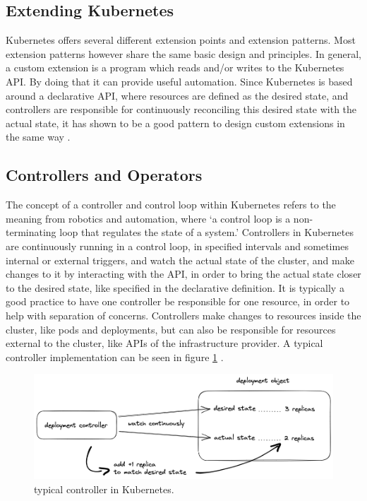 \subsection*{Extending Kubernetes}
Kubernetes offers several different extension points and extension patterns.
Most extension patterns however share the same basic design and principles.
In general, a custom extension is a program which reads and/or writes
to the Kubernetes API. By doing that it can provide useful automation.
Since Kubernetes is based around a declarative API,
where resources are defined as the desired state,
and controllers are responsible for continuously reconciling this
desired state with the actual state,
it has shown to be a good pattern to design custom extensions in the same way
\autocite{extendKubernetes}.

\subsection*{Controllers and Operators}
The concept of a controller and control loop within Kubernetes refers to the
meaning from robotics and automation, where
\enquote*{a control loop is a non-terminating loop that regulates the state of a system.}
\autocite{controllersKubernetes}
Controllers in Kubernetes are continuously running in a control loop,
in specified intervals and sometimes internal or external triggers, 
and watch the actual state of the cluster,
and make changes to it by interacting with the API,
in order to bring the actual state closer to the desired state,
like specified in the declarative definition.
It is typically a good practice to have one controller
be responsible for one resource, 
in order to help with separation of concerns.
Controllers make changes to resources inside the cluster,
like pods and deployments,
but can also be responsible for resources external to the cluster,
like APIs of the infrastructure provider.
A typical controller implementation can be seen in figure \ref{fig:typicalControllerKubernetes}
\autocite{controllersKubernetes}.

\begin{figure}[h]
	\centering
	\includegraphics[width=1.00\linewidth]{assets/typical-controller.png}
	\caption{typical controller in Kubernetes.
	}
	\label{fig:typicalControllerKubernetes}	
\end{figure}


